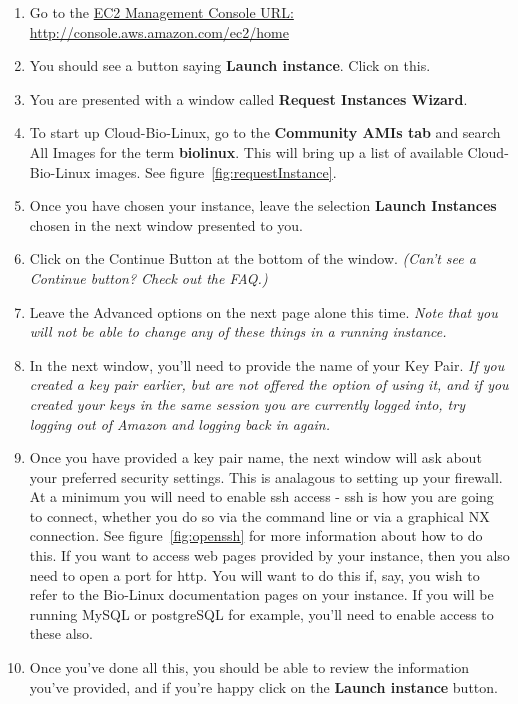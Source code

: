 
\begin{enumerate}
\item Go to the \href{http://console.aws.amazon.com/ec2/home}{EC2 Management Console URL: http://console.aws.amazon.com/ec2/home}
\item You should see a button saying \textbf{Launch instance}. Click on this. 
\item You are presented with a window called \textbf{Request Instances Wizard}. 
\item To start up Cloud-Bio-Linux, go to the \textbf{Community AMIs tab} and search All Images for the term \textbf{biolinux}. This will bring up a list of available Cloud-Bio-Linux images. See figure~\ref{fig:requestInstance}.
\item Once you have chosen your instance, leave the selection \textbf{Launch Instances} chosen in the next window presented to you.
\item Click on the Continue Button at the bottom of the window. \emph{(Can't see a Continue button? Check out the FAQ.)}
\item Leave the Advanced options on the next page alone this time. \emph{Note that you will not be able to change any of these things in a running instance.}
\item In the next window, you'll need to provide the name of your Key Pair. \emph{If you created a key pair earlier, but are not offered the option of using it, and if you created your keys in the same session you are currently logged into, try logging out of Amazon and logging back in again.}
\item Once you have provided a key pair name, the next window will ask about your preferred security settings. This is analagous to setting up your firewall. At a minimum you will need to enable ssh access - ssh is how you are going to connect, whether you do so via the command line or via a graphical NX connection. See figure~\ref{fig:openssh} for more information about how to do this. If you want to access web pages provided by your instance, then you also need to open a port for http. You will want to do this if, say, you wish to refer to the Bio-Linux documentation pages on your instance. If you will be running MySQL or postgreSQL for example, you'll need to enable access to these also.
\item Once you've done all this, you should be able to review the information you've provided, and if you're happy click on the \textbf{Launch instance} button.
\end{enumerate}


